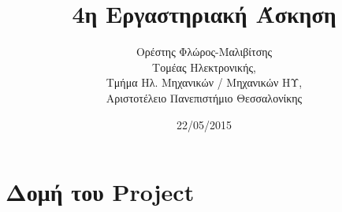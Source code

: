 \usetikzlibrary{external}
\tikzexternalize

\newcommand{\deloldext}[2]{%
   \immediate\write18{./deloldext.pl '#1' '#2'}
}
\newcommand{\includetikz}[1]{%
    \tikzsetnextfilename{#1}%
    \deloldext{#1.tikz}{#1.pdf}%
}


\usepackage{fontspec}
\setmainfont{DejaVu Serif}
\renewcommand{\contentsname}{Περιεχόμενα}
\renewcommand{\listfigurename}{Λίστα Σχημάτων}
\renewcommand{\figurename}{Σχήμα}



\title{4η Εργαστηριακή Άσκηση}
\author{Ορέστης Φλώρος-Μαλιβίτσης\\
  Τομέας Ηλεκτρονικής,\\
  Τμήμα Ηλ. Μηχανικών / Μηχανικών ΗΥ,\\
  Αριστοτέλειο Πανεπιστήμιο Θεσσαλονίκης}
\date{22/05/2015}

%



\maketitle
\tableofcontents
\listoffigures
\newpage


\chapter*{Δομή του Project} \label{project-structure}

